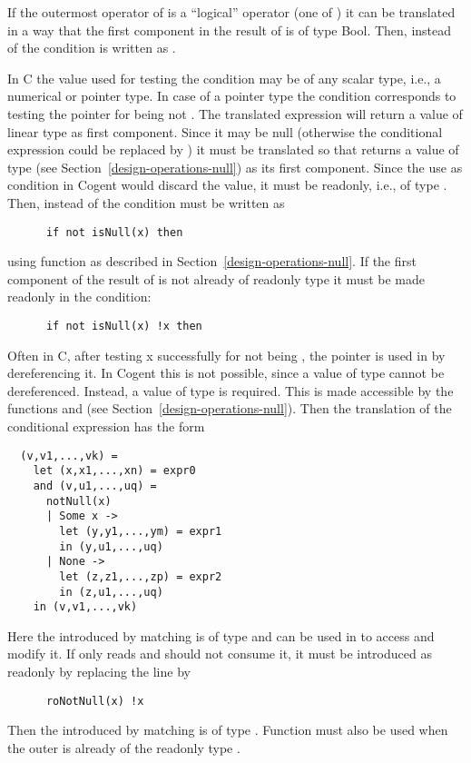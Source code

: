 If the outermost operator of  is a ``logical'' operator (one of \code{<, <=, >, >=, ==, !=, \&\&, ||})
it can be translated in a way that the first component in the result of  is of type Bool.
Then, instead of  the condition is written as .

In C the value used for testing the condition may be of any scalar type, i.e., a numerical or pointer type.
In case of a pointer type the condition corresponds to testing the pointer for being not .
The translated expression  will return a value of linear type as first component. Since it
may be null (otherwise the conditional expression could be replaced by ) it must be translated
so that  returns a value of type  (see Section~\ref{design-operations-null})
as its first component. Since the use as condition in Cogent would discard the value, it must be readonly,
i.e., of type . Then, instead of  the condition must be written as
\begin{verbatim}
      if not isNull(x) then 
\end{verbatim}
using function  as described in Section~\ref{design-operations-null}. If the first component
of the result of  is not already of readonly type it must be made readonly in the condition:
\begin{verbatim}
      if not isNull(x) !x then 
\end{verbatim}

Often in C, after testing x successfully for not being , the pointer  is used in 
 by dereferencing it. In Cogent this is not possible, since a value of type  cannot
be dereferenced. Instead, a value of type  is required. This is made accessible by the functions
 and  (see Section~\ref{design-operations-null}). Then the translation of the
conditional expression has the form
\begin{verbatim}
  (v,v1,...,vk) = 
    let (x,x1,...,xn) = expr0
    and (v,u1,...,uq) =
      notNull(x)
      | Some x -> 
        let (y,y1,...,ym) = expr1 
        in (y,u1,...,uq)
      | None ->
        let (z,z1,...,zp) = expr2
        in (z,u1,...,uq)
    in (v,v1,...,vk) 
\end{verbatim}
Here the  introduced by matching  is of type  and can be used in 
to access and modify it. If  only reads  and should not consume it, it must be introduced
as readonly by replacing the line  by
\begin{verbatim}
      roNotNull(x) !x
\end{verbatim}
Then the  introduced by matching  is of type . Function  must also
be used when the outer  is already of the readonly type .

